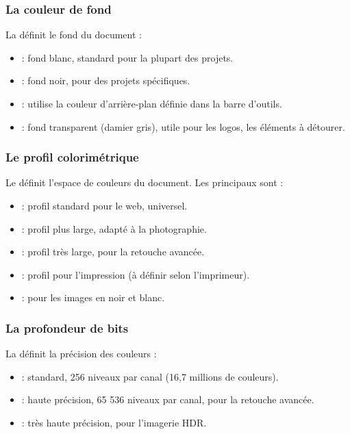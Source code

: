 \subsubsection{La couleur de fond}

La  définit le fond du document :

\begin{itemize}
    \item {} : fond blanc, standard pour la plupart des projets.
    \item {} : fond noir, pour des projets spécifiques.
    \item {} : utilise la couleur d'arrière-plan définie dans la barre d'outils.
    \item {} : fond transparent (damier gris), utile pour les logos, les éléments à détourer.
\end{itemize}

\subsubsection{Le profil colorimétrique}

Le  définit l'espace de couleurs du document. Les principaux sont :

\begin{itemize}
    \item {} : profil standard pour le web, universel.
    \item {} : profil plus large, adapté à la photographie.
    \item {} : profil très large, pour la retouche avancée.
    \item {} : profil pour l'impression (à définir selon l'imprimeur).
    \item {} : pour les images en noir et blanc.
\end{itemize}

\subsubsection{La profondeur de bits}

La  définit la précision des couleurs :

\begin{itemize}
    \item {} : standard, 256 niveaux par canal (16,7 millions de couleurs).
    \item {} : haute précision, 65 536 niveaux par canal, pour la retouche avancée.
    \item {} : très haute précision, pour l'imagerie HDR.
\end{itemize}

